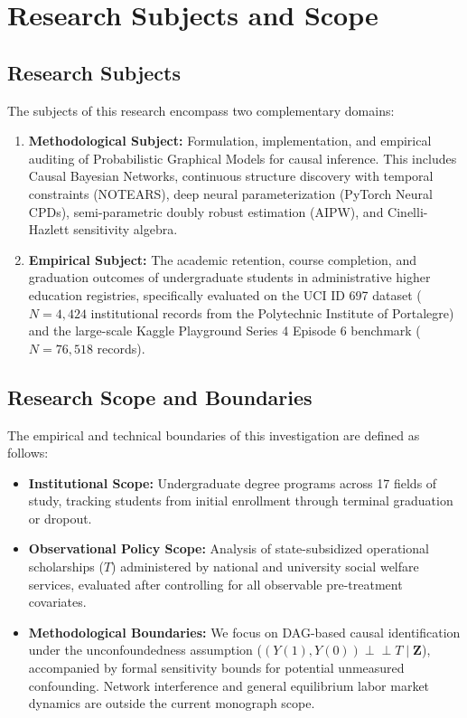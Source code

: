 \section{Research Subjects and Scope}
\label{sec:intro_scope}

\subsection{Research Subjects}
The subjects of this research encompass two complementary domains:
\begin{enumerate}
    \item \textbf{Methodological Subject:} Formulation, implementation, and empirical auditing of Probabilistic Graphical Models for causal inference. This includes Causal Bayesian Networks, continuous structure discovery with temporal constraints (NOTEARS), deep neural parameterization (PyTorch Neural CPDs), semi-parametric doubly robust estimation (AIPW), and Cinelli-Hazlett sensitivity algebra.
    \item \textbf{Empirical Subject:} The academic retention, course completion, and graduation outcomes of undergraduate students in administrative higher education registries, specifically evaluated on the UCI ID 697 dataset ($N = 4,424$ institutional records from the Polytechnic Institute of Portalegre) and the large-scale Kaggle Playground Series 4 Episode 6 benchmark ($N = 76,518$ records).
\end{enumerate}

\subsection{Research Scope and Boundaries}
The empirical and technical boundaries of this investigation are defined as follows:
\begin{itemize}
    \item \textbf{Institutional Scope:} Undergraduate degree programs across 17 fields of study, tracking students from initial enrollment through terminal graduation or dropout.
    \item \textbf{Observational Policy Scope:} Analysis of state-subsidized operational scholarships ($T$) administered by national and university social welfare services, evaluated after controlling for all observable pre-treatment covariates.
    \item \textbf{Methodological Boundaries:} We focus on DAG-based causal identification under the unconfoundedness assumption ($(Y(1), Y(0)) \perp\!\!\!\perp T \mid \mathbf{Z}$), accompanied by formal sensitivity bounds for potential unmeasured confounding. Network interference and general equilibrium labor market dynamics are outside the current monograph scope.
\end{itemize}

